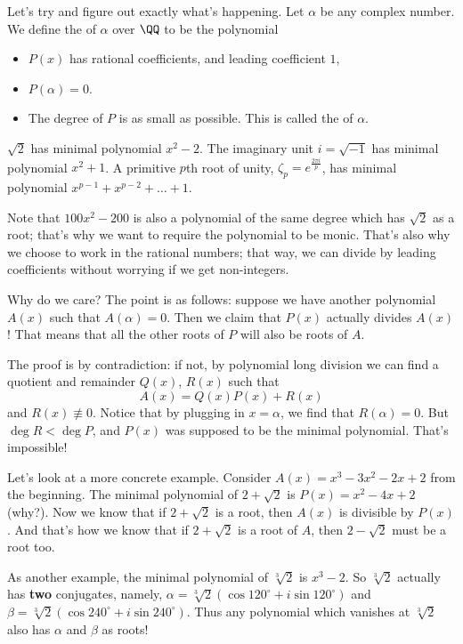 Let's try and figure out exactly what's happening.
Let $\alpha$ be any complex number.
We define the  of $\alpha$ over $\QQ$ to be the polynomial
\begin{itemize}
	\item $P(x)$ has rational coefficients, and leading coefficient $1$,
	\item $P(\alpha) = 0$.
	\item The degree of $P$ is as small as possible.
		This is called the  of $\alpha$.
\end{itemize}
\begin{example}
	\listhack
	\begin{enumerate}[(a)]
	\ii $\sqrt 2$ has minimal polynomial $x^2-2$.
	\ii The imaginary unit $i = \sqrt{-1}$ has minimal polynomial $x^2+1$.
	\ii A primitive $p$th root of unity, $\zeta_p = e^{\frac{2\pi i}{p}}$, has minimal polynomial $x^{p-1} + x^{p-2} + \dots + 1$.
	\end{enumerate}
\end{example}
Note that $100x^2 - 200$ is also a polynomial of the same degree which has $\sqrt 2$ as a root; that's why we want to require the polynomial to be monic. That's also why we choose to work in the rational numbers; that way, we can divide by leading coefficients without worrying if we get non-integers.

Why do we care? The point is as follows: suppose we have another polynomial $A(x)$ such that $A(\alpha) = 0$.
Then we claim that $P(x)$ actually divides $A(x)$!
That means that all the other roots of $P$ will also be roots of $A$.

The proof is by contradiction: if not, by polynomial long division we can find a quotient and remainder $Q(x)$, $R(x)$ such that
\[ A(x) = Q(x) P(x) + R(x) \]
and $R(x) \not\equiv 0$.
Notice that by plugging in $x = \alpha$, we find that $R(\alpha) = 0$.
But $\deg R < \deg P$, and $P(x)$ was supposed to be the minimal polynomial.
That's impossible!

Let's look at a more concrete example.
Consider $A(x) = x^3-3x^2-2x+2$ from the beginning. 
The minimal polynomial of $2 + \sqrt 2$ is $P(x) = x^2 - 4x + 2$ (why?).
Now we know that if $2 + \sqrt 2$ is a root, then $A(x)$ is divisible by $P(x)$.
And that's how we know that if $2 + \sqrt 2$ is a root of $A$, then $2 - \sqrt 2$ must be a root too.

As another example, the minimal polynomial of $\sqrt[3]{2}$ is $x^3-2$. So $\sqrt[3]{2}$ actually has \textbf{two} conjugates, namely, $\alpha = \sqrt[3]{2} \left( \cos 120^\circ + i \sin 120^\circ \right)$ and $\beta = \sqrt[3]{2} \left( \cos 240^\circ + i \sin 240^\circ \right)$. Thus any polynomial which vanishes at $\sqrt[3]{2}$ also has $\alpha$ and $\beta$ as roots!

